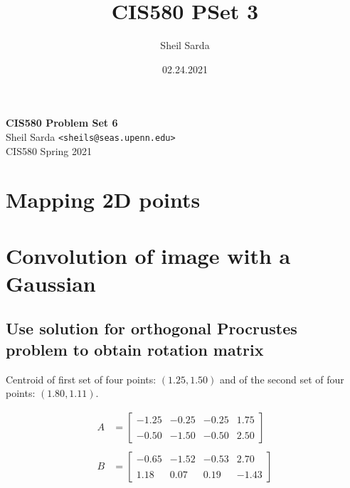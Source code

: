 \documentclass[12pt, oneside]{article}
\title{CIS580 PSet 3}
\author{Sheil Sarda}
\date{02.24.2021}
\begin{document}

\begin{titlepage}
    \begin{flushleft}
        \vspace*{1cm}
        \Huge
        \textbf{CIS580 Problem Set 6\\ }
        \vspace*{0.5cm}
        \normalsize
        Sheil Sarda \verb|<sheils@seas.upenn.edu>| \\
        CIS580 Spring 2021
        \tableofcontents
    \end{flushleft}
\end{titlepage}

\section{Mapping 2D points}

\section{Convolution of image with a Gaussian}



\subsection{Use solution for orthogonal Procrustes problem to obtain rotation 
matrix}

Centroid of first set of four points: $(1.25, 1.50)$ and of the 
second set of four points: $(1.80, 1.11)$.

\begin{align*}
    A    &= 
    \begin{bmatrix} -1.25 & -0.25 & -0.25 & 1.75\\ \\ 
                    -0.50 & -1.50 & -0.50 & 2.50
    \end{bmatrix} \\ \\
    B    &= 
    \begin{bmatrix} -0.65 & -1.52 & -0.53 & 2.70\\ \\ 
                    1.18 &  0.07 &  0.19 & -1.43
    \end{bmatrix} 
\end{align*}
\end{document}
